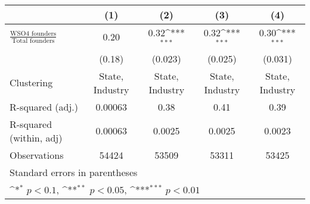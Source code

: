 {
\def\sym#1{\ifmmode^{#1}\else\(^{#1}\)\fi}
\begin{tabular}{l*{4}{c}}
\toprule
                    &\multicolumn{1}{c}{(1)}         &\multicolumn{1}{c}{(2)}         &\multicolumn{1}{c}{(3)}         &\multicolumn{1}{c}{(4)}         \\
\midrule
$\frac{\text{WSO4 founders}}{\text{Total founders}}$&        0.20         &        0.32\sym{***}&        0.32\sym{***}&        0.30\sym{***}\\
                    &      (0.18)         &     (0.023)         &     (0.025)         &     (0.031)         \\
\midrule
Clustering          &State, Industry         &State, Industry         &State, Industry         &State, Industry         \\
R-squared (adj.)    &     0.00063         &        0.38         &        0.41         &        0.39         \\
R-squared (within, adj)&     0.00063         &      0.0025         &      0.0025         &      0.0023         \\
Observations        &       54424         &       53509         &       53311         &       53425         \\
\bottomrule
\multicolumn{5}{l}{\tiny Standard errors in parentheses}\\
\multicolumn{5}{l}{\tiny \sym{*} \(p<0.1\), \sym{**} \(p<0.05\), \sym{***} \(p<0.01\)}\\
\end{tabular}
}
